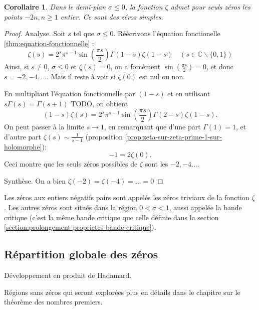 \documentclass[french]{report}
\newtheorem{corollary}[theorem]{Corollaire}
\begin{document}
\begin{corollary}\label{cor:zeta-non-nul-demi-plan-ferme-negatif}
  Dans le demi-plan $\sigma\leq0$, la fonction $\zeta$ admet pour seuls zéros les points $-2n, n\geq1$ entier. Ce sont des zéros simples.
\end{corollary}

\begin{proof}
  Analyse. Soit $s$ tel que $\sigma\leq0$. Réécrivons l'équation fonctionelle \ref{thm:equation-fonctionnelle} :
  \[ \zeta(s) = 2^s\pi^{s-1}\sin\left(\frac{\pi s}{2}\right)\Gamma(1-s)\zeta(1-s)\quad (s\in\mathbb{C}\backslash\{0,1\}) \]
  Ainsi, si $s\neq0$, $\sigma\leq0$ et $\zeta(s)=0$, on a forcément $\sin(\frac{\pi s}{2})=0$, et donc $s=-2,-4,...$. Mais il reste à voir si $\zeta(0)$ est nul ou non.

  En multipliant l'équation fonctionnelle par $(1-s)$ et en utilisant $s\Gamma(s)=\Gamma(s+1)$ TODO, on obtient
  \[ (1-s)\zeta(s) = 2^s\pi^{s-1}\sin\left(\frac{\pi s}{2}\right)\Gamma(2-s)\zeta(1-s). \]
  On peut passer à la limite $s\to1$, en remarquant que d'une part $\Gamma(1)=1$, et d'autre part $\zeta(s)\sim\frac{1}{s-1}$ (proposition \ref{prop:zeta-sur-zeta-prime-1-sur-holomorphe}):
  \[ -1 = 2\zeta(0). \]
  Ceci montre que les seuls zéros possibles de $\zeta$ sont les $-2, -4...$.

  Synthèse. On a bien $\zeta(-2)=\zeta(-4)=...=0$
\end{proof}

Les zéros aux entiers négatifs pairs sont appelés les zéros triviaux de la fonction $\zeta$. Les autres zéros sont situés dans la région $0<\sigma<1$, aussi appelée la bande critique (c'est la même bande critique que celle définie dans la section \ref{section:prolongement-proprietes-bande-critique}).

\subsection{Répartition globale des zéros}

Développement en produit de Hadamard.

Régions sans zéros qui seront explorées plus en détails dans le chapitre sur le théorème des nombres premiers.

\end{document}
